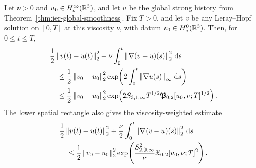 \begin{theorem}
\label{thm:app-relative-energy}
Let \(\nu>0\) and \(u_0\in H^\infty_\sigma(\mathbb R^3)\), and let \(u\) be the global strong history
from Theorem~\ref{thm:ier-global-smoothness}.  Fix \(T>0\), and let \(v\) be
any Leray--Hopf solution on \([0,T]\) at this viscosity \(\nu\), with
datum \(v_0\in H^0_\sigma(\mathbb R^3)\).  Then, for \(0\le t\le T\),
\begin{align}
 &\frac12\left\lVert v(t)-u(t)\right\rVert_2^2
 +\nu\int_0^t\left\lVert \nabla(v-u)(s)\right\rVert_2^2\,\mathrm d s
 \notag\\
 &\quad\le
 \frac12\left\lVert v_0-u_0\right\rVert_2^2
 \exp\!\left(
 2\int_0^t\left\lVert \nabla u(s)\right\rVert_\infty\,\mathrm d s
 \right)
 \label{eq:app-relative-energy-action}\\
 &\quad\le
 \frac12\left\lVert v_0-u_0\right\rVert_2^2
 \exp\!\left(
 2S_{3,1,\infty}T^{1/2}
 \mathfrak P_{0,2}[u_0,\nu;T]^{1/2}
 \right).
 \label{eq:app-relative-energy-producer}
\end{align}
The lower spatial rectangle also gives the viscosity-weighted estimate
\begin{align}
 &\frac12\left\lVert v(t)-u(t)\right\rVert_2^2
 +\frac\nu2\int_0^t\left\lVert \nabla(v-u)(s)\right\rVert_2^2\,\mathrm d s
 \notag\\
 &\quad\le
 \frac12\left\lVert v_0-u_0\right\rVert_2^2
 \exp\!\left(
 \frac{S_{2,0,\infty}^2}{\nu}
 \mathfrak X_{0,2}[u_0,\nu;T]^2
 \right).
 \label{eq:app-relative-energy-low-rectangle}
\end{align}
\end{theorem}

